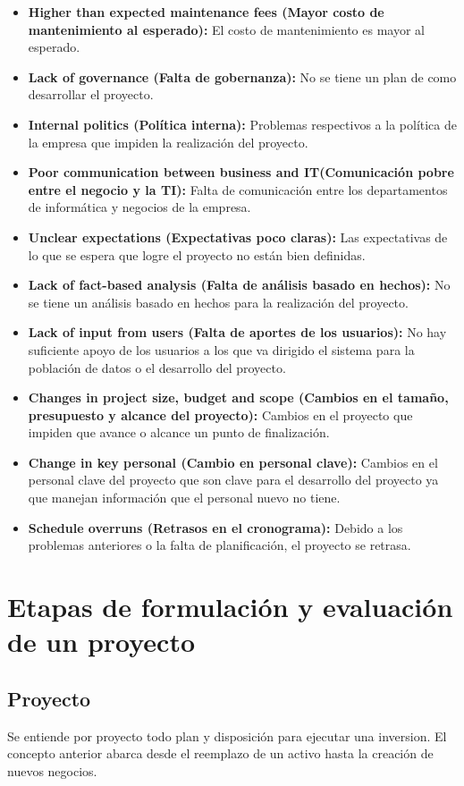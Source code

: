 \documentclass{templateNote}
\begin{document}
\begin{itemize}
    \item \textbf{Higher than expected maintenance fees (Mayor costo de mantenimiento al esperado):} El costo de mantenimiento es mayor al esperado.
    \item \textbf{Lack of governance (Falta de gobernanza):} No se tiene un plan de como desarrollar el proyecto.
    \item \textbf{Internal politics (Política interna):} Problemas respectivos a la política de la empresa que impiden la realización del proyecto.
    \item \textbf{Poor communication between business and IT(Comunicación pobre entre el negocio y la TI):} Falta de comunicación entre los departamentos de informática y negocios de la empresa.
    \item \textbf{Unclear expectations (Expectativas poco claras):} Las expectativas de lo que se espera que logre el proyecto no están bien definidas.
    \item \textbf{Lack of fact-based analysis (Falta de análisis basado en hechos):} No se tiene un análisis basado en hechos para la realización del proyecto.
    \item \textbf{Lack of input from users (Falta de aportes de los usuarios):} No hay suficiente apoyo de los usuarios a los que va dirigido el sistema para la población de datos o el desarrollo del proyecto.
    \item \textbf{Changes in project size, budget and scope (Cambios en el tamaño, presupuesto y alcance del proyecto):} Cambios en el proyecto que impiden que avance o alcance un punto de finalización.
    \item \textbf{Change in key personal (Cambio en personal clave):} Cambios en el personal clave del proyecto que son clave para el desarrollo del proyecto ya que manejan información que el personal nuevo no tiene.
    \item \textbf{Schedule overruns (Retrasos en el cronograma):} Debido a los problemas anteriores o la falta de planificación, el proyecto se retrasa.
\end{itemize}

\newpage
\section{Etapas de formulación y evaluación de un proyecto}

\subsection*{Proyecto}
Se entiende por proyecto todo plan y disposición para ejecutar una inversion. El concepto anterior abarca desde el reemplazo de un activo hasta la creación de nuevos negocios.
\end{document}
